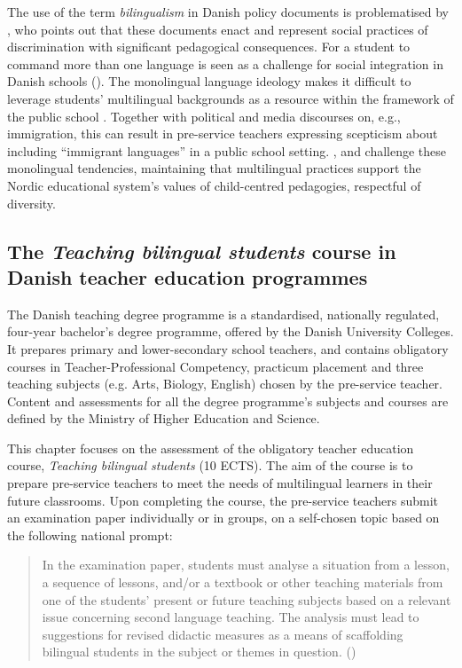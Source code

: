 \documentclass[output=paper]{langscibook}
\begin{document}
The use of the term \textit{bilingualism} in Danish policy documents is problematised by \citet{Kristjánsdóttir2011}, who points out that these documents enact and represent social practices of discrimination with significant pedagogical consequences. For a student to command more than one language is seen as a challenge for social integration in Danish schools (\citealt{Kristjánsdóttir2010,Kristjánsdóttir2011}). The monolingual language ideology makes it difficult to leverage students’ multilingual backgrounds as a resource within the framework of the public school \citep{Kristjánsdóttir2018}.  Together with political and media discourses on, e.g., immigration, this can result in pre-service teachers expressing scepticism about including “immigrant languages” in a public school setting. \citet{Iversen2021}, \citet{Kulbrandstad2004} and \citet{DaugaardDewilde2017}  challenge these monolingual tendencies, maintaining that multilingual practices support the Nordic educational system’s values of child\hyp centred pedagogies, respectful of diversity.

\subsection{The \textit{Teaching bilingual students} course in Danish teacher education programmes}\label{sec:ostergaard:2.2}

The Danish teaching degree programme is a standardised, nationally regulated, four-year bachelor’s degree programme, offered by the Danish University Colleges. It prepares primary and lower-secondary school teachers, and contains obligatory courses in Teacher-Professional Competency, practicum placement and three teaching subjects (e.g. Arts, Biology, English) chosen by the pre-service teacher. Content and assessments for all the degree programme’s subjects and courses are defined by the Ministry of Higher Education and Science. 

This chapter focuses on the assessment of the obligatory teacher education course, \textit{Teaching bilingual students} (10 ECTS). The aim of the course is to prepare pre-service teachers to meet the needs of multilingual learners in their future classrooms. Upon completing the course, the pre-service teachers submit an examination paper individually or in groups, on a self-chosen topic based on the following national prompt: 

\begin{quote}
In the examination paper, students must analyse a situation from a lesson, a sequence of lessons, and/or a textbook or other teaching materials from one of the students' present or future teaching subjects based on a relevant issue concerning second language teaching. The analysis must lead to suggestions for revised didactic measures as a means of scaffolding bilingual students in the subject or themes in question. (\citealt{MinistryHigherEducationScience2020})
\end{quote}
\end{document}
